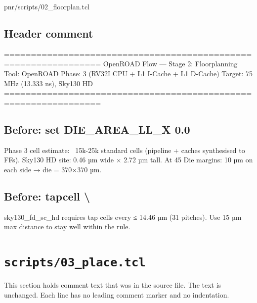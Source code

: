 \begin{relocated}{pnr/scripts/02_floorplan.tcl}

\subsection*{Header comment}

\begin{textblock}
================================================================
OpenROAD Flow — Stage 2: Floorplanning
Tool: OpenROAD
Phase: 3 (RV32I CPU + L1 I-Cache + L1 D-Cache)
Target: 75 MHz (13.333 ns), Sky130 HD
================================================================
\end{textblock}

\subsection*{Before: set DIE\_AREA\_LL\_X 0.0}

\begin{textblock}
Phase 3 cell estimate: ~15k-25k standard cells (pipeline + caches synthesised to FFs).
Sky130 HD site: 0.46 µm wide × 2.72 µm tall.
At 45%
Die margins: 10 µm on each side → die = 370×370 µm.
\end{textblock}

\subsection*{Before: tapcell \textbackslash{}}

\begin{textblock}
sky130_fd_sc_hd requires tap cells every ≤ 14.46 µm (31 pitches).
Use 15 µm max distance to stay well within the rule.
\end{textblock}

\end{relocated}

\section{\texttt{scripts/03\_place.tcl}}\label{tm:pd:scripts-03-place-tcl}

This section holds comment text that was in the source file. The text is unchanged. Each line has no leading comment marker and no indentation.

